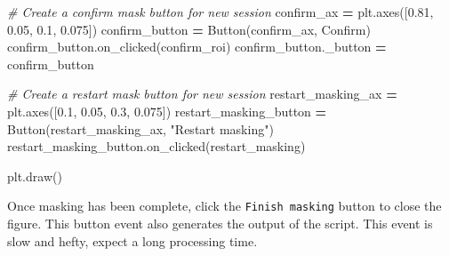 \documentclass[
]{article}
\newenvironment{Shaded}{\begin{snugshade}}{\end{snugshade}}
\newcommand{\CommentTok}[1]{\textcolor[rgb]{0.56,0.35,0.01}{\textit{#1}}}
\newcommand{\FloatTok}[1]{\textcolor[rgb]{0.00,0.00,0.81}{#1}}
\newcommand{\NormalTok}[1]{#1}
\newcommand{\OperatorTok}[1]{\textcolor[rgb]{0.81,0.36,0.00}{\textbf{#1}}}
\newcommand{\StringTok}[1]{\textcolor[rgb]{0.31,0.60,0.02}{#1}}
\begin{document}
\begin{Shaded}
\begin{Highlighting}[]
    \CommentTok{\# Create a confirm mask button for new session}
\NormalTok{    confirm\_ax }\OperatorTok{=}\NormalTok{ plt.axes([}\FloatTok{0.81}\NormalTok{, }\FloatTok{0.05}\NormalTok{, }\FloatTok{0.1}\NormalTok{, }\FloatTok{0.075}\NormalTok{])}
\NormalTok{    confirm\_button }\OperatorTok{=}\NormalTok{ Button(confirm\_ax, }\StringTok{\textquotesingle{}Confirm\textquotesingle{}}\NormalTok{)}
\NormalTok{    confirm\_button.on\_clicked(confirm\_roi)}
\NormalTok{    confirm\_button.\_button }\OperatorTok{=}\NormalTok{ confirm\_button}

    \CommentTok{\# Create a restart mask button for new session}
\NormalTok{    restart\_masking\_ax }\OperatorTok{=}\NormalTok{ plt.axes([}\FloatTok{0.1}\NormalTok{, }\FloatTok{0.05}\NormalTok{, }\FloatTok{0.3}\NormalTok{, }\FloatTok{0.075}\NormalTok{])}
\NormalTok{    restart\_masking\_button }\OperatorTok{=}\NormalTok{ Button(restart\_masking\_ax, }\StringTok{"Restart masking"}\NormalTok{)}
\NormalTok{    restart\_masking\_button.on\_clicked(restart\_masking)}

\NormalTok{    plt.draw()}
\end{Highlighting}
\end{Shaded}

Once masking has been complete, click the \texttt{Finish\ masking} button to close the figure. This button event also generates the output of the script. This event is slow and hefty, expect a long processing time.
\end{document}
